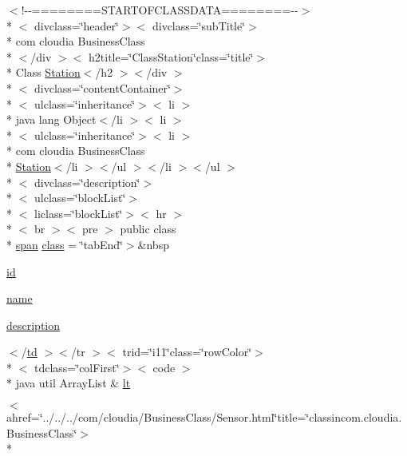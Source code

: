 \begin{DoxyCompactItemize}
$<$!-\/-\/========S\-T\-A\-R\-T\-O\-F\-C\-L\-A\-S\-S\-D\-A\-T\-A========-\/-\/$>$\\*
$<$ divclass=\char`\"{}header\char`\"{}$>$$<$ divclass=\char`\"{}sub\-Title\char`\"{}$>$\\*
 com cloudia Business\-Class\\*
$<$/div $>$$<$ h2title=\char`\"{}Class\-Station\char`\"{}class=\char`\"{}title\char`\"{}$>$\\*
 Class \hyperlink{index-17_8html_ac2375aa22a64908f3538d08a030e35bd}{Station}$<$/h2 $>$$<$/div $>$\\*
$<$ divclass=\char`\"{}content\-Container\char`\"{}$>$\\*
$<$ ulclass=\char`\"{}inheritance\char`\"{}$>$$<$ li $>$\\*
 java lang Object$<$/li $>$$<$ li $>$\\*
$<$ ulclass=\char`\"{}inheritance\char`\"{}$>$$<$ li $>$\\*
 com cloudia Business\-Class \\*
\hyperlink{index-17_8html_ac2375aa22a64908f3538d08a030e35bd}{Station}$<$/li $>$$<$/ul $>$$<$/li $>$$<$/ul $>$\\*
$<$ divclass=\char`\"{}description\char`\"{}$>$\\*
$<$ ulclass=\char`\"{}block\-List\char`\"{}$>$\\*
$<$ liclass=\char`\"{}block\-List\char`\"{}$>$$<$ hr $>$\\*
$<$ br $>$$<$ pre $>$ public class \\*
\hyperlink{stylesheet_8css_a8343996ebcf16220b04e54659aac31cc}{span} \hyperlink{_station_8html_ac5201036ae28c42eb4a32886e17d8ef7}{class} = \char`\"{}tab\-End\char`\"{}$>$\&nbsp
\item 
\hyperlink{_station_8html_acf2488b95c97e0378c9bf49de3b50f28}{id}
\item 
\hyperlink{_station_8html_ab74e6bf80237ddc4109968cedc58c151}{name}
\item 
\hyperlink{_station_8html_a2661f439a4a94ffdcd5e47ae1da0bb1d}{description}
\item 
$<$/\hyperlink{stylesheet_8css_a2635d454965afd759ce151c6f6d1a04a}{td} $>$$<$/tr $>$$<$ trid=\char`\"{}i11\char`\"{}class=\char`\"{}row\-Color\char`\"{}$>$\\*
$<$ tdclass=\char`\"{}col\-First\char`\"{}$>$$<$ code $>$\\*
 java util Array\-List \& \hyperlink{_station_8html_a6046ea68583de5557b637104e82142fd}{lt}
\item 
$<$ ahref=\char`\"{}../../../com/cloudia/Business\-Class/Sensor.\-html\char`\"{}title=\char`\"{}classincom.\-cloudia.\-Business\-Class\char`\"{}$>$\\*

\end{DoxyCompactItemize}
